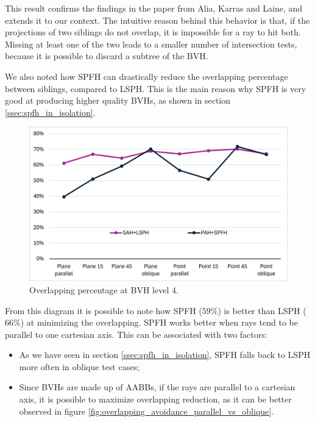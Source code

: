 \documentclass{PoliMi_MasterThesis}
\begin{document}
This result confirms the findings in the paper from Alia, Karras and Laine, and extends it to our context. The intuitive reason behind this behavior is that, if the projections of two siblings do not overlap, it is impossible for a ray to hit both. Missing at least one of the two leads to a smaller number of intersection tests, because it is possible to discard a subtree of the BVH.

We also noted how SPFH can drastically reduce the overlapping percentage between siblings, compared to LSPH. This is the main reason why SPFH is very good at producing higher quality BVHs, as shown in section \ref{ssec:spfh_in_isolation}.

\begin{figure}[H] 
	\centering
	\includegraphics[width=\textwidth]{Images/siblings_overlapping_spfh_vs_lsph.png}
	\caption{Overlapping percentage at BVH level 4.}
	\label{fig:pah_overlapping_children}
\end{figure}

From this diagram it is possible to note how SPFH ($59\%$) is better than LSPH ($66\%$) at minimizing the overlapping. SPFH works better when rays tend to be parallel to one cartesian axis. This can be associated with two factors: 
\begin{itemize}
	\item As we have seen in section \ref{ssec:spfh_in_isolation}, SPFH falls back to LSPH more often in oblique test cases;
	\item Since BVHs are made up of AABBs, if the rays are parallel to a cartesian axis, it is possible to maximize overlapping reduction, as it can be better observed in figure \ref{fig:overlapping_avoidance_parallel_vs_oblique}.
\end{itemize}
\end{document}
